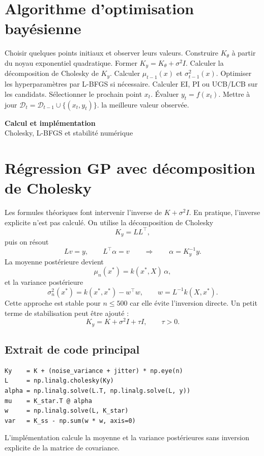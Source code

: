 \documentclass[12pt]{article}
\newcommand{\D}{\mathcal{D}}
\newcommand{\xs}{x^{*}}
\newcommand{\dividerpage}[2]{%
  \newpage \thispagestyle{empty}
  \vspace*{0.32\textheight}
  \begin{center}
    {\Huge\bfseries #1}\\[14pt]
    {\Large #2}
  \end{center}
  \newpage}
\begin{document}
\section*{Algorithme d'optimisation bayésienne}

\begin{algorithm}[h]
\caption{Optimisation bayésienne avec processus gaussien}
\begin{algorithmic}[1]
\State Choisir quelques points initiaux et observer leurs valeurs.
  \State Construire $K_\theta$ à partir du noyau exponentiel quadratique.
  \State Former $K_y = K_\theta + \sigma^2 I$.
  \State Calculer la décomposition de Cholesky de $K_y$.
  \State Calculer $\mu_{t-1}(x)$ et $\sigma_{t-1}^2(x)$.
  \State Optimiser les hyperparamètres par L-BFGS si nécessaire.
  \State Calculer EI, PI ou UCB/LCB sur les candidats.
  \State Sélectionner le prochain point $x_t$.
  \State Évaluer $y_t = f(x_t)$.
  \State Mettre à jour $\D_t = \D_{t-1}\cup\{(x_t,y_t)\}$.
\EndFor
\State \Return la meilleure valeur observée.
\end{algorithmic}
\end{algorithm}

\dividerpage{Calcul et implémentation}{Cholesky, L-BFGS et stabilité numérique}

\section*{Régression GP avec décomposition de Cholesky}

Les formules théoriques font intervenir l'inverse de $K + \sigma^2 I$. En
pratique, l'inverse explicite n'est pas calculé. On utilise la décomposition de
Cholesky
\[
K_y = L L^\top,
\]
puis on résout
\[
L v = y, \qquad L^\top \alpha = v
\qquad\Longrightarrow\qquad
\alpha = K_y^{-1} y.
\]
La moyenne postérieure devient
\[
\mu_n(\xs) = k(\xs,X)\,\alpha,
\]
et la variance postérieure
\[
\sigma_n^2(\xs) = k(\xs,\xs) - w^\top w,
\qquad w = L^{-1} k(X,\xs).
\]
Cette approche est stable pour $n \le 500$ car elle évite l'inversion directe. Un
petit terme de stabilisation peut être ajouté :
\[
K_y = K + \sigma^2 I + \tau I, \qquad \tau > 0.
\]

\subsection*{Extrait de code principal}
\begin{verbatim}
Ky    = K + (noise_variance + jitter) * np.eye(n)
L     = np.linalg.cholesky(Ky)
alpha = np.linalg.solve(L.T, np.linalg.solve(L, y))
mu    = K_star.T @ alpha
w     = np.linalg.solve(L, K_star)
var   = K_ss - np.sum(w * w, axis=0)
\end{verbatim}
L'implémentation calcule la moyenne et la variance postérieures sans inversion
explicite de la matrice de covariance.
\end{document}
